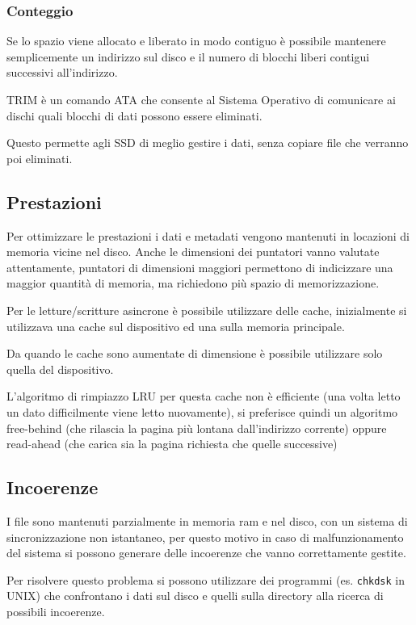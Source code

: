 \subsubsection{Conteggio}
Se lo spazio viene allocato e liberato in modo contiguo è possibile mantenere semplicemente un indirizzo sul disco e il numero di blocchi liberi contigui successivi all'indirizzo.

\begin{note}
    TRIM è un comando ATA che consente al Sistema Operativo di comunicare ai dischi quali blocchi di dati possono essere eliminati.

    Questo permette agli SSD di meglio gestire i dati, senza copiare file che verranno poi eliminati.
\end{note}

\subsection{Prestazioni}
Per ottimizzare le prestazioni i dati e metadati vengono mantenuti in locazioni di memoria vicine nel disco.
Anche le dimensioni dei puntatori vanno valutate attentamente, puntatori di dimensioni maggiori permettono di indicizzare una maggior quantità di memoria, ma richiedono più spazio di memorizzazione.

\spacer
Per le letture/scritture asincrone è possibile utilizzare delle cache, inizialmente si utilizzava una cache sul dispositivo ed una sulla memoria principale.

Da quando le cache sono aumentate di dimensione è possibile utilizzare solo quella del dispositivo.

\spacer
L'algoritmo di rimpiazzo LRU per questa cache non è efficiente (una volta letto un dato difficilmente viene letto nuovamente), si preferisce quindi un algoritmo free-behind (che rilascia la pagina più lontana dall'indirizzo corrente) oppure read-ahead (che carica sia la pagina richiesta che quelle successive)

\subsection{Incoerenze}
I file sono mantenuti parzialmente in memoria ram e nel disco, con un sistema di sincronizzazione non istantaneo, per questo motivo in caso di malfunzionamento del sistema si possono generare delle incoerenze che vanno correttamente gestite.

\spacer
Per risolvere questo problema si possono utilizzare dei programmi (es. \texttt{chkdsk} in UNIX) che confrontano i dati sul disco e quelli sulla directory alla ricerca di possibili incoerenze.

